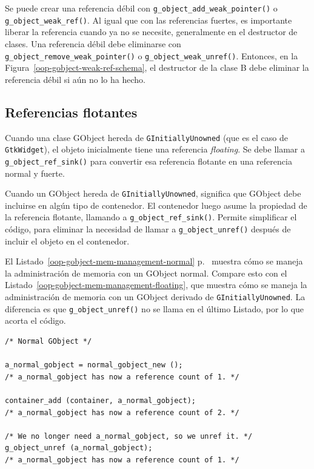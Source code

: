 Se puede crear una referencia débil con \lstinline{g_object_add_weak_pointer()} o \lstinline{g_object_weak_ref()}. Al igual que con las referencias fuertes, es importante liberar la referencia cuando ya no se necesite, generalmente en el destructor de clases. Una referencia débil debe eliminarse con \lstinline{g_object_remove_weak_pointer()} o \lstinline{g_object_weak_unref()}. Entonces, en la Figura~\ref{oop-gobject-weak-ref-schema}, el destructor de la clase B debe eliminar la referencia débil si aún no lo ha hecho.

\subsection{Referencias flotantes}

Cuando una clase GObject hereda de \lstinline{GInitiallyUnowned} (que es el caso de \lstinline{GtkWidget}), el objeto inicialmente tiene una referencia \emph{floating}. Se debe llamar a \lstinline{g_object_ref_sink()} para convertir esa referencia flotante en una referencia normal y fuerte.

Cuando un GObject hereda de \lstinline{GInitiallyUnowned}, significa que GObject debe incluirse en algún tipo de contenedor. El contenedor luego asume la propiedad de la referencia flotante, llamando a \lstinline{g_object_ref_sink()}. Permite simplificar el código, para eliminar la necesidad de llamar a \lstinline{g_object_unref()} después de incluir el objeto en el contenedor.

El Listado~\ref{oop-gobject-mem-management-normal} p.~\pageref{oop-gobject-mem-management-normal} muestra cómo se maneja la administración de memoria con un GObject normal. Compare esto con el Listado~\ref{oop-gobject-mem-management-floating}, que muestra cómo se maneja la administración de memoria con un GObject derivado de \lstinline{GInitiallyUnowned}. La diferencia es que \lstinline{g_object_unref()} no se llama en el último Listado, por lo que acorta el código.

\begin{lstlisting}[float=p, caption={Gestión de la memoria de GObjects normales.}, label=oop-gobject-mem-management-normal]
/* Normal GObject */

a_normal_gobject = normal_gobject_new ();
/* a_normal_gobject has now a reference count of 1. */

container_add (container, a_normal_gobject);
/* a_normal_gobject has now a reference count of 2. */

/* We no longer need a_normal_gobject, so we unref it. */
g_object_unref (a_normal_gobject);
/* a_normal_gobject has now a reference count of 1. */
\end{lstlisting}

